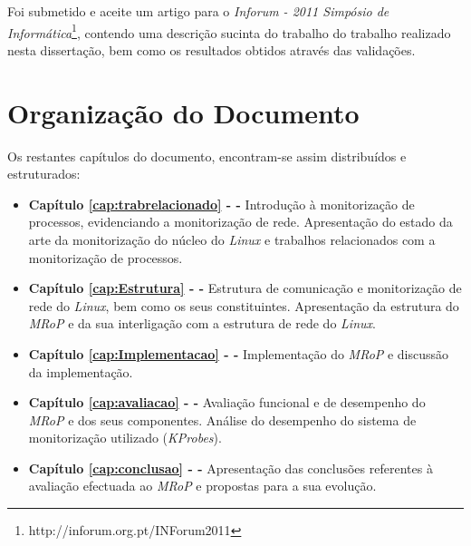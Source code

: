 Foi submetido e aceite um artigo para o \textit{Inforum - 2011 Simpósio de Informática}\footnote{http://inforum.org.pt/INForum2011}, contendo uma descrição sucinta do trabalho do trabalho realizado nesta dissertação, bem como os resultados obtidos através das validações.\cite{inforum}

\bigskip 


\section{Organização do Documento}
\label{sec:intro_document_outline}

Os restantes capítulos do documento, encontram-se assim distribuídos e estruturados:

\begin{itemize}
	\item \textbf{Capítulo \ref{cap:trabrelacionado} -  - } Introdução à monitorização de processos, evidenciando a monitorização de rede. Apresentação do estado da arte da monitorização do núcleo do \textit{Linux} e trabalhos relacionados com a monitorização de processos.

	\item \textbf{Capítulo \ref{cap:Estrutura} -   - } Estrutura de comunicação e monitorização de rede do \textit{Linux}, bem como os seus constituintes. Apresentação da estrutura do \textit{MRoP} e da sua interligação com a estrutura de rede do \textit{Linux}.

	\item \textbf{Capítulo \ref{cap:Implementacao} -  - } Implementação do \textit{MRoP} e discussão da implementação.

	\item \textbf{Capítulo \ref{cap:avaliacao} -  - } Avaliação funcional e de desempenho do \textit{MRoP} e dos seus componentes. Análise do desempenho do sistema de monitorização utilizado (\textit{KProbes}).

	\item \textbf{Capítulo \ref{cap:conclusao} -  - } Apresentação das conclusões referentes à avaliação efectuada ao \textit{MRoP} e propostas para a sua evolução.

\end{itemize}
